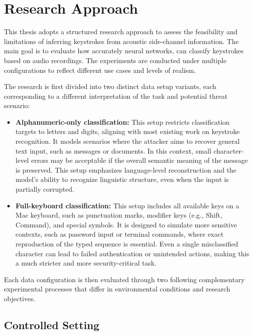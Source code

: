 \documentclass[a4paper,11pt,twoside]{report}
\theoremstyle{definition}
\begin{document}
\section{Research Approach}

This thesis adopts a structured research approach to assess the feasibility and limitations of inferring keystrokes from acoustic side-channel information. The main goal is to evaluate how accurately neural networks, can classify keystrokes based on audio recordings. The experiments are conducted under multiple configurations to reflect different use cases and levels of realism.

\vspace{0.3cm}

The research is first divided into two distinct data setup variants, each corresponding to a different interpretation of the task and potential threat scenario:

\begin{itemize}
    \item \textbf{Alphanumeric-only classification:} This setup restricts classification targets to letters and digits, aligning with most existing work on keystroke recognition. It models scenarios where the attacker aims to recover general text input, such as messages or documents. In this context, small character-level errors may be acceptable if the overall semantic meaning of the message is preserved. This setup emphasizes language-level reconstruction and the model’s ability to recognize linguistic structure, even when the input is partially corrupted.

    \item \textbf{Full-keyboard classification:} This setup includes all available keys on a Mac keyboard, such as punctuation marks, modifier keys (e.g., Shift, Command), and special symbols. It is designed to simulate more sensitive contexts, such as password input or terminal commands, where exact reproduction of the typed sequence is essential. Even a single misclassified character can lead to failed authentication or unintended actions, making this a much stricter and more security-critical task.
\end{itemize}

\vspace{0.3cm}

Each data configuration is then evaluated through two following complementary experimental processes that differ in environmental conditions and research objectives.


\subsection{Controlled Setting}
\end{document}
